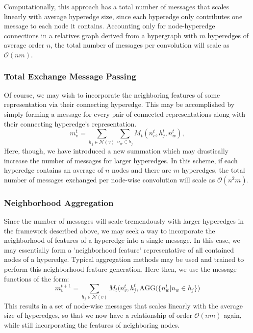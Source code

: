 \documentclass[twoside,twocolumn,9pt]{article}
\begin{document}
Computationally, this approach has a total number of messages that scales linearly with average hyperedge size, since each hyperedge only contributes one message to each node it contains.
Accounting only for node-hyperedge connections in a relatives graph derived from a hypergraph with $m$ hyperedges of average order $n$, the total number of messages per convolution will scale as $\mathcal{O}(nm)$.

\subsubsection{Total Exchange Message Passing}
Of course, we may wish to incorporate the neighboring features of some representation via their connecting hyperedge. This may be accomplished by simply forming a message for every pair of connected representations along with their connecting hyperedge's representation.
$$
m_v^{t} = \sum_{h_j\in \mathcal{N}(v)} \sum_{n_w \in h_j } M_t(n_v^{t},h_j^{t}, n_w^t),
$$
Here, though, we have introduced a new summation which may drastically increase the number of messages for larger hyperedges. In this scheme, if each hyperedge contains an average of $n$ nodes and there are $m$ hyperedges, the total number of messages exchanged per node-wise convolution will scale as $\mathcal{O}(n^2m)$.


\subsubsection{Neighborhood Aggregation}
Since the number of messages will scale tremendously with larger hyperedges in the framework described above, we may seek a way to incorporate the neighborhood of features of a hyperedge into a single message. In this case, we may essentially form a 'neighborhood feature' representative of all contained nodes of a hyperedge. Typical aggregation methods may be used and trained to perform this neighborhood feature generation. Here then, we use the message functions of the form:
$$
m_v^{t+1}=\sum_{h_j\in \mathcal{N}(v)} M_t(n_v^{t},h_j^{t},\text{AGG}\big(\lbrace n_w^t \vert n_w \in h_j \rbrace\big)
$$
This results in a set of node-wise messages that scales linearly with the average size of hyperedges, so that we now have a relationship of order $\mathcal{O}(nm)$ again, while still incorporating the features of neighboring nodes.
\end{document}
